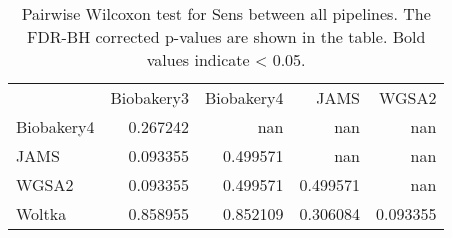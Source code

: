 \begin{table}
\caption{Pairwise Wilcoxon test for Sens between all pipelines. The FDR-BH corrected p-values are shown in the table. Bold values indicate < 0.05.}
\label{tab:pairwise_Sens}
\begin{tabular}{lrrrr}
 & Biobakery3 & Biobakery4 & JAMS & WGSA2 \\
Biobakery4 & 0.267242 & nan & nan & nan \\
JAMS & 0.093355 & 0.499571 & nan & nan \\
WGSA2 & 0.093355 & 0.499571 & 0.499571 & nan \\
Woltka & 0.858955 & 0.852109 & 0.306084 & 0.093355 \\
\end{tabular}
\end{table}
